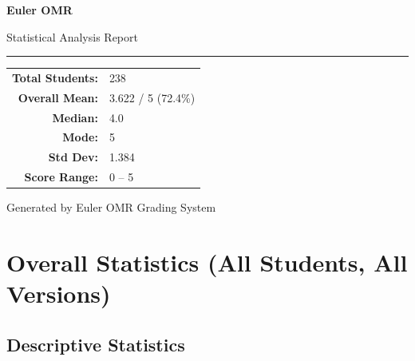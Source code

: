 \documentclass[12pt, a4paper]{article}
\begin{document}
	
	\begin{titlepage}
		\centering
		\vspace*{3cm}
		{\Huge\bfseries\color{primary} Euler OMR\par}
		\vspace{0.4cm}
		{\LARGE\color{accent} Statistical Analysis Report\par}
		\vspace{1cm}
		\textcolor{medgray}{\rule{0.6\textwidth}{0.6pt}}
		\vspace{0.8cm}
		
		\begin{tcolorbox}[
			width=0.65\textwidth,
			colback=lightgray,
			colframe=medgray,
			arc=4pt,
			boxrule=0.6pt
			]
			\centering
			\begin{tabular}{rl}
				\textbf{Total Students:} & 238 \\[4pt]
				\textbf{Overall Mean:}   & 3.622 / 5 \quad (72.4\%) \\[4pt]
				\textbf{Median:}         & 4.0 \\[4pt]
				\textbf{Mode:}           & 5 \\[4pt]
				\textbf{Std Dev:}        & 1.384 \\[4pt]
				\textbf{Score Range:}    & 0 -- 5 \\
			\end{tabular}
		\end{tcolorbox}
		
		\vfill
		{\small\color{medgray} Generated by Euler OMR Grading System}
	\end{titlepage}
	
	\section{Overall Statistics (All Students, All Versions)}
	
	\subsection{Descriptive Statistics}
	
\end{document}
